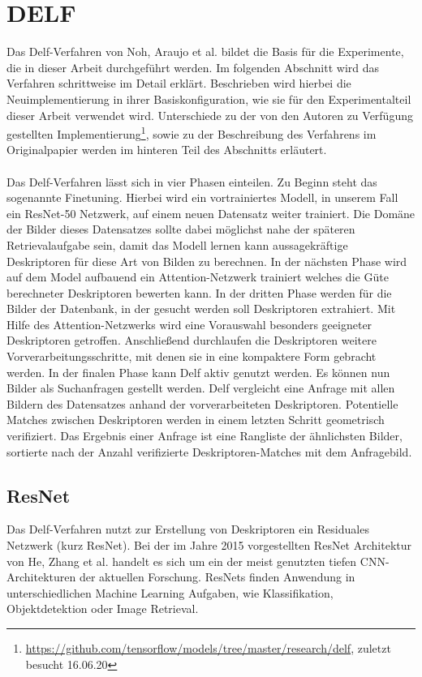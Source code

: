 \chapter{DELF}\label{delf_chapter}
Das Delf-Verfahren \cite{delf} von Noh, \mbox{Araujo} et al. bildet die Basis für die Experimente, die in dieser Arbeit durchgeführt werden. Im folgenden Abschnitt wird das Verfahren schrittweise im Detail erklärt. Beschrieben wird hierbei die Neuimplementierung in ihrer Basiskonfiguration, wie sie für den Experimentalteil dieser Arbeit verwendet wird. Unterschiede zu der von den Autoren zu Verfügung gestellten Implementierung\footnote[1]{\url{https://github.com/tensorflow/models/tree/master/research/delf}, zuletzt besucht 16.06.20}, sowie zu der Beschreibung des Verfahrens im Originalpapier \cite{delf} werden im hinteren Teil des Abschnitts erläutert. 
\\\\
Das Delf-Verfahren lässt sich in vier Phasen einteilen. Zu Beginn steht das sogenannte Finetuning. Hierbei wird ein vortrainiertes Modell, in unserem Fall ein ResNet-50 Netzwerk, auf einem neuen Datensatz weiter trainiert. Die Domäne der Bilder dieses Datensatzes sollte dabei möglichst nahe der späteren Retrievalaufgabe sein, damit das Modell lernen kann aussagekräftige Deskriptoren für diese Art von Bilden zu berechnen. In der nächsten Phase wird auf dem Model aufbauend ein Attention-Netzwerk trainiert welches die Güte berechneter Deskriptoren bewerten kann. In der dritten Phase werden für die Bilder der Datenbank, in der gesucht werden soll Deskriptoren extrahiert. Mit Hilfe des Attention-Netzwerks wird eine Vorauswahl besonders geeigneter Deskriptoren getroffen. Anschließend durchlaufen die Deskriptoren weitere Vorverarbeitungsschritte, mit denen sie in eine kompaktere Form gebracht werden. In der finalen Phase kann Delf aktiv genutzt werden. Es können nun Bilder als Suchanfragen gestellt werden. Delf vergleicht eine Anfrage mit allen Bildern des Datensatzes anhand der vorverarbeiteten Deskriptoren. Potentielle Matches zwischen Deskriptoren werden in einem letzten Schritt geometrisch verifiziert. Das Ergebnis einer Anfrage ist eine Rangliste der ähnlichsten Bilder, sortierte nach der Anzahl verifizierte Deskriptoren-Matches mit dem Anfragebild.

\section{ResNet}

Das Delf-Verfahren nutzt zur Erstellung von Deskriptoren ein Residuales Netzwerk (kurz ResNet). Bei der im Jahre 2015 vorgestellten ResNet Architektur \cite{resnet} von He, Zhang et al. handelt es sich um ein der meist genutzten tiefen CNN-Architekturen der aktuellen Forschung. ResNets finden Anwendung in unterschiedlichen Machine Learning Aufgaben, wie Klassifikation, Objektdetektion oder Image Retrieval. \\

